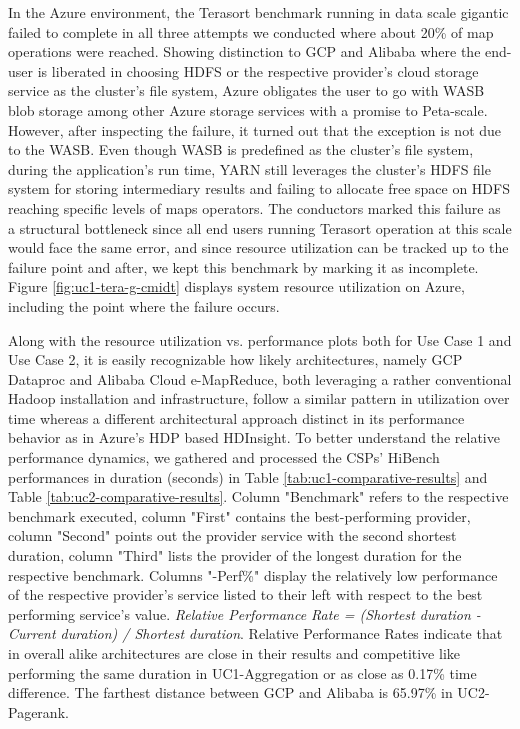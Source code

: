 \documentclass[review]{elsarticle}
\begin{document}
In the Azure environment, the Terasort benchmark running in data scale gigantic failed to complete in all three attempts we conducted where about 20\% of map operations were reached. Showing distinction to GCP and Alibaba where the end-user is liberated in choosing HDFS or the respective provider's cloud storage service as the cluster's file system, Azure obligates the user to go with WASB blob storage among other Azure storage services with a promise to Peta-scale. However, after inspecting the failure, it turned out that the exception is not due to the WASB. Even though WASB is predefined as the cluster's file system, during the application's run time, YARN still leverages the cluster's HDFS file system for storing intermediary results and failing to allocate free space on HDFS reaching specific levels of maps operators. The conductors marked this failure as a structural bottleneck since all end users running Terasort operation at this scale would face the same error, and since resource utilization can be tracked up to the failure point and after, we kept this benchmark by marking it as incomplete. Figure \ref{fig:uc1-tera-g-cmidt} displays system resource utilization on Azure, including the point where the failure occurs.

Along with the resource utilization vs. performance plots both for Use Case 1 and Use Case 2, it is easily recognizable how likely architectures, namely GCP Dataproc and Alibaba Cloud e-MapReduce, both leveraging a rather conventional Hadoop installation and infrastructure, follow a similar pattern in utilization over time whereas a different architectural approach distinct in its performance behavior as in Azure's HDP based HDInsight. To better understand the relative performance dynamics, we gathered and processed the CSPs' HiBench performances in duration (seconds) in Table \ref{tab:uc1-comparative-results} and Table \ref{tab:uc2-comparative-results}. Column "Benchmark" refers to the respective benchmark executed, column "First" contains the best-performing provider, column "Second" points out the provider service with the second shortest duration, column "Third" lists the provider of the longest duration for the respective benchmark. Columns "-Perf\%" display the relatively low performance of the respective provider's service listed to their left with respect to the best performing service's value. \textit{Relative Performance Rate = (Shortest duration - Current duration) / Shortest duration}. Relative Performance Rates indicate that in overall alike architectures are close in their results and competitive like performing the same duration in UC1-Aggregation or as close as 0.17\% time difference. The farthest distance between GCP and Alibaba is 65.97\% in UC2-Pagerank.
\end{document}
